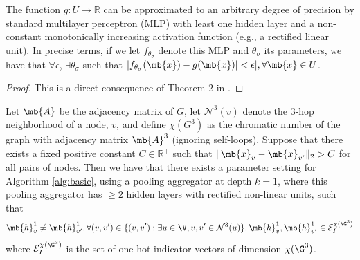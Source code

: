 \begin{lemma}
The function $g : U \rightarrow \mathbb{R}$ can be approximated to an arbitrary degree of precision by standard multilayer perceptron (MLP) with least one hidden layer and a non-constant monotonically increasing activation function (e.g., a rectified linear unit).  In precise terms, if we let $f_{\theta_\sigma}$ denote this MLP and $\theta_\sigma$ its parameters, we have that $\forall \epsilon$, $\exists \theta_\sigma$ such that 
$|f_{\theta_\sigma}(\mb{x}) - g(\mb{x})| < \epsilon|, \forall \mb{x} \in U$.
\end{lemma}
\begin{proof}
This is a direct consequence of Theorem 2 in \cite{hornik1991approximation}.
\end{proof}

\begin{lemma}
Let $\mb{A}$ be the adjacency matrix of $G$, let $\mathcal{N}^3(v)$ denote the 3-hop neighborhood of a node, $v$, and define $\chi(G^3)$ as the chromatic number of the graph with adjacency matrix $\mb{A}^3$ (ignoring self-loops). Suppose that there exists a fixed positive constant $C \in \mathbb{R}^+$ such that $\|\mb{x}_v  - \mb{x}_{v'}\|_2 > C$ for all pairs of nodes. Then we have that there exists a parameter setting for Algorithm \ref{alg:basic}, using a pooling aggregator at depth $k=1$, where this pooling aggregator has $\geq 2$ hidden layers with rectified non-linear units, such that 
$$\mb{h}^1_v \neq \mb{h}^1_{v'}, \forall (v,v') \in \{(v,v') : \exists u \in \V, v,v' \in \mathcal{N}^3(u)\}, \mb{h}^1_v, \mb{h}^1_{v'} \in \mathcal{E}^{\chi(\G^3)}_I$$
where $\mathcal{E}^{\chi(\G^3)}_I$ is the set of one-hot indicator vectors of dimension $\mathcal{\chi}(\G^3)$.
\end{lemma}
